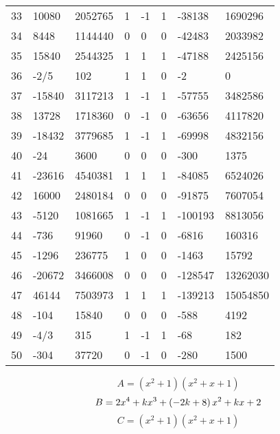 \documentclass{amsart}
\begin{document}
\begin{longtable}{|l|l|l|lllll|}
33&10080&2052765&1&-1&1&-38138&1690296\\
34&8448&1144440&0&0&0&-42483&2033982\\
35&15840&2544325&1&1&1&-47188&2425156\\
36&-2/5&102&1&1&0&-2&0\\
37&-15840&3117213&1&-1&1&-57755&3482586\\
38&13728&1718360&0&-1&0&-63656&4117820\\
39&-18432&3779685&1&-1&1&-69998&4832156\\
40&-24&3600&0&0&0&-300&1375\\
41&-23616&4540381&1&1&1&-84085&6524026\\
42&16000&2480184&0&0&0&-91875&7607054\\
43&-5120&1081665&1&-1&1&-100193&8813056\\
44&-736&91960&0&-1&0&-6816&160316\\
45&-1296&236775&1&0&0&-1463&15792\\
46&-20672&3466008&0&0&0&-128547&13262030\\
47&46144&7503973&1&1&1&-139213&15054850\\
48&-104&15840&0&0&0&-588&4192\\
49&-4/3&315&1&-1&1&-68&182\\
50&-304&37720&0&-1&0&-280&1500\\
\hline
\end{longtable}
$$A=(x^2
 + 1)(x^2
 + x
 + 1)$$
$$B=2\*x^4
 + k\*x^3
 + \left(-2\*k
 + 8\right) \*x^2
 + k\*x
 + 2$$
$$C=(x^2
 + 1)(x^2
 + x
 + 1)$$
\end{document}
